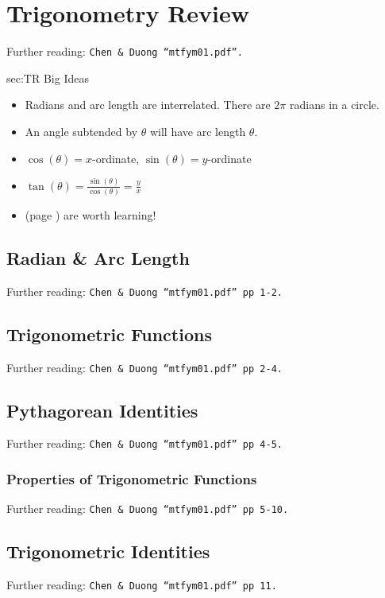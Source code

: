 \chapter{Trigonometry Review}
\label{chap:TR}
Further reading: \texttt{Chen \& Duong ``mtfym01.pdf''.}

\begin{bigideas}{sec:TR Big Ideas}
\begin{itemize}
  \item Radians and arc length are interrelated. There are $2\pi$ radians
  in a circle.
  \item An angle subtended by $\theta$ will have arc length $\theta$.
  \item $\cos(\theta) = x$-ordinate, $\sin(\theta) = y$-ordinate
  \item $\tan(\theta) = \frac{\sin(\theta)}{\cos(\theta)} = \frac{y}{x}$
  \item {} (page \pageref{sec:TR
  Pythagorean Identities}) are worth learning!
\end{itemize}
\end{bigideas}

\section{Radian \& Arc Length}
\label{sec:TR Radian and Arc Length}
Further reading: \texttt{Chen \& Duong ``mtfym01.pdf'' pp 1-2.}

\section{Trigonometric Functions}
\label{sec:TR Trigonometric Functions}
Further reading: \texttt{Chen \& Duong ``mtfym01.pdf'' pp 2-4.}

\section{Pythagorean Identities}
\label{sec:TR Pythagorean Identities}
Further reading: \texttt{Chen \& Duong ``mtfym01.pdf'' pp 4-5.}

\subsection{Properties of Trigonometric Functions}
\label{subsec:TR Trigonometric Functions - Properties}
Further reading: \texttt{Chen \& Duong ``mtfym01.pdf'' pp 5-10.}

\section{Trigonometric Identities}
\label{sec:TR Trigonometric Identities}
Further reading: \texttt{Chen \& Duong ``mtfym01.pdf'' pp 11.}

